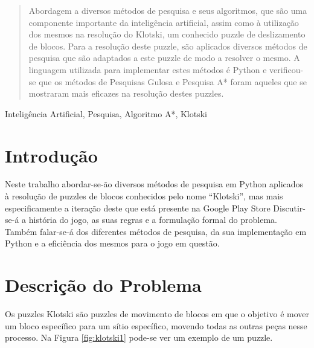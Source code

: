 \documentclass[conference]{IEEEtran}
\begin{document}
\maketitle

\begin{abstract}
Abordagem a diversos métodos de pesquisa e seus algoritmos, que são uma componente importante da inteligência artificial, assim como à utilização dos mesmos na resolução do Klotski, um conhecido puzzle de deslizamento de blocos.
Para a resolução deste puzzle, são aplicados diversos métodos de pesquisa que são adaptados a este puzzle de modo a resolver o mesmo. A linguagem utilizada para implementar estes métodos é Python e verificou-se que os métodos de Pesquisas Gulosa e Pesquisa A* foram aqueles que se mostraram mais eficazes na resolução destes puzzles.
\end{abstract}

\begin{IEEEkeywords}
Inteligência Artificial, Pesquisa, Algoritmo A*, Klotski
\end{IEEEkeywords}

\section{Introdução}
Neste trabalho abordar-se-ão diversos métodos de pesquisa em Python aplicados à resolução de puzzles de blocos conhecidos pelo nome “Klotski”, mas mais especificamente a iteração deste que está presente na Google Play Store \cite{b1} Discutir-se-á a história do jogo, as suas regras e a formulação formal do problema. Também falar-se-á dos diferentes métodos de pesquisa, da sua implementação em Python e a eficiência dos mesmos para o jogo em questão. 

\section{Descrição do Problema}
Os puzzles Klotski são puzzles de movimento de blocos em que o objetivo é mover um bloco específico para um sítio específico, movendo todas as outras peças nesse processo. Na Figura \ref{fig:klotski1} pode-se ver um exemplo de um puzzle.
\end{document}
